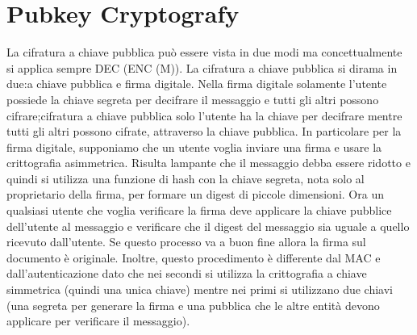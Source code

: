 \documentclass[a4paper,draft]{article}
\begin{document}
\section{Pubkey Cryptografy}
La cifratura a chiave pubblica può essere vista in due modi ma concettualmente si applica sempre DEC (ENC (M))\@.
La cifratura a chiave pubblica si dirama in due:\@cifratura a chiave pubblica e firma digitale\@.\newline
Nella firma digitale solamente l'utente possiede la chiave segreta per decifrare il messaggio e tutti gli altri possono cifrare;\@nella cifratura a chiave pubblica solo l'utente ha la chiave per decifrare mentre tutti gli altri possono cifrate, attraverso la chiave pubblica\@. In particolare per la firma digitale, supponiamo che un utente voglia inviare una firma e usare la crittografia asimmetrica\@. Risulta lampante che il messaggio debba essere ridotto e quindi si utilizza una funzione di hash con la chiave segreta, nota solo al proprietario della firma, per formare un digest di piccole dimensioni\@. Ora un qualsiasi utente che voglia verificare la firma deve applicare la chiave pubblice dell'utente al messaggio e verificare che il digest del messaggio sia uguale a quello ricevuto dall'utente\@. Se questo processo va a buon fine allora la firma sul documento è originale\@.\newline
Inoltre, questo procedimento è differente dal MAC e dall'autenticazione dato che nei secondi si utilizza la crittografia a chiave simmetrica (quindi una unica chiave) mentre nei primi si utilizzano due chiavi (una segreta per generare la firma e una pubblica che le altre entità devono applicare per verificare il messaggio).
\end{document}
